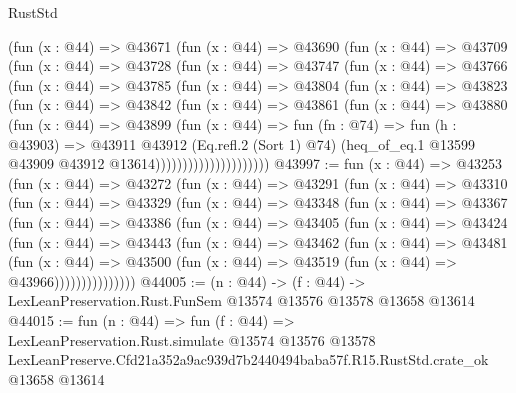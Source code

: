 \begin{lexlean}{RustStd}
\begin{coremodule}
                (fun (x : @44) =>
                @43671
                  (fun (x : @44) =>
                  @43690
                    (fun (x : @44) =>
                    @43709
                      (fun (x : @44) =>
                      @43728
                        (fun (x : @44) =>
                        @43747
                          (fun (x : @44) =>
                          @43766
                            (fun (x : @44) =>
                            @43785
                              (fun (x : @44) =>
                              @43804
                                (fun (x : @44) =>
                                @43823
                                  (fun (x : @44) =>
                                  @43842
                                    (fun (x : @44) =>
                                    @43861
                                      (fun (x : @44) =>
                                      @43880
                                        (fun (x : @44) =>
                                        @43899
                                          (fun (x : @44) =>
                                          fun (fn : @74) =>
                                          fun (h : @43903) =>
                                          @43911
                                            @43912
                                            (Eq.refl.{2} (Sort 1) @74)
                                            (heq_of_eq.{1}
                                              @13599
                                              @43909
                                              @43912
                                              @13614)))))))))))))))))))))
@43997 := fun (x : @44) =>
  @43253
    (fun (x : @44) =>
    @43272
      (fun (x : @44) =>
      @43291
        (fun (x : @44) =>
        @43310
          (fun (x : @44) =>
          @43329
            (fun (x : @44) =>
            @43348
              (fun (x : @44) =>
              @43367
                (fun (x : @44) =>
                @43386
                  (fun (x : @44) =>
                  @43405
                    (fun (x : @44) =>
                    @43424
                      (fun (x : @44) =>
                      @43443
                        (fun (x : @44) =>
                        @43462
                          (fun (x : @44) =>
                          @43481
                            (fun (x : @44) =>
                            @43500 (fun (x : @44) => @43519 (fun (x : @44) => @43966)))))))))))))))
@44005 := (n : @44) ->
  (f : @44) -> LexLeanPreservation.Rust.FunSem @13574 @13576 @13578 @13658 @13614
@44015 := fun (n : @44) =>
  fun (f : @44) =>
  LexLeanPreservation.Rust.simulate
    @13574
    @13576
    @13578
    LexLeanPreserve.Cfd21a352a9ac939d7b2440494baba57f.R15.RustStd.crate_ok
    @13658
    @13614
\end{coremodule}
\end{lexlean}
